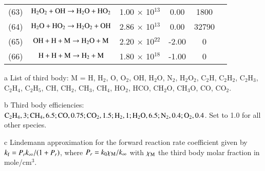 \documentclass{warpdoc}
\begin{document}
\begin{table}[h]
\begin{center}
\begin{threeparttable}
\begin{tabular}{cccccc}
(63) & $\rm H_2 O_2 + OH \rightarrow H_2 O + H O_2 $ &1.00 $\times$ 10$^{13}$  &0.00 &1800&\cite{rkm:1991:smoke}\\

(64) & $\rm H_2 O + H O_2  \rightarrow H_2 O_2 + OH $ &2.86 $\times$ 10$^{13}$  &0.00 &32790&\cite{rkm:1991:smoke}\\

(65) & $\rm OH + H+ M  \rightarrow H_2 O +M $ &2.20 $\times$ 10$^{22}$  &-2.00 &0&\cite{rkm:1991:smoke}\\

(66) & $\rm H + H+ M  \rightarrow H_2  +M $ &1.80 $\times$ 10$^{18}$  &-1.00 &0&\cite{rkm:1991:smoke}\\

\bottomrule
\end{tabular}
\label{tab:park}
\begin{tablenotes}
\item[{a}] List of third body: M = H, H$_2$, O, O$_2$, OH, H$_2$O, N$_2$, H$_2$O$_2$,
   C$_2$H, C$_2$H$_2$, C$_2$H$_3$, C$_2$H$_4$, C$_2$H$_5$, CH, CH$_2$, 
   CH$_3$, CH$_4$, HO$_2$, HCO, CH$_2$O, CH$_3$O, CO, CO$_2$.
\item[{b}] Third body efficiencies: $\rm C_2 H_4, 3; CH_4, 6.5; CO, 0.75; C O_2, 1.5; H_2, 1; H_2 O, 6.5; N_2, 0.4; O_2, 0.4$. Set to 1.0 for all other species.
\item[{c}] Lindemann approximation for the forward
reaction rate coefficient given by $k_{\rm f} = P_r k_\infty / (1+P_r)$, where $P_r = k_{0}\chi_{\rm M}/k_\infty$ with $\chi_{\rm M}$ the third body molar fraction in mole/cm$^3$.

\end{tablenotes}
\end{threeparttable}
\end{center}
\end{table} 
%
\clearpage


\end{document}
